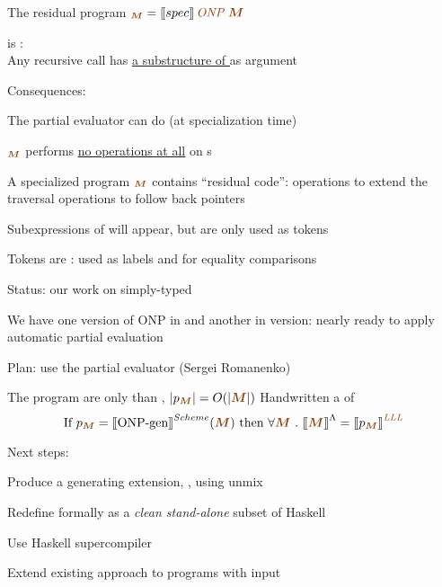 \documentclass[12pt,fleqn,landscape]{article}
\begin{document}
\begin{slide}{The residual program $_{\lam{$M$}} = 
  \lsem \lowercase{spec}\rsem \, \lam{ONP}\ \lam{$M$}$}

 is :\\

\hfill{Any recursive  call has \underline{\underline{a substructure 
  of }} as argument}
\vair\vair

Consequences:
\bi
\vair

\ii The partial evaluator can do (at specialization time)

  \hfill {}
\ii {}$_{\lam{$M$}}$ performs \underline{no operations at all} on 
  {\lexp}s
\vair

\ii A specialized program $_{\lam{$M$}}$ contains ``residual code'':
  \bi
  \ii operations to extend the traversal
  \ii operations to follow back pointers
  \ei
\vair

\ii Subexpressions of  will appear, but are only used as tokens
  \vair

  Tokens are : used as labels and for equality comparisons
\ei

\end{slide}


\begin{slide}{Status: our work on simply-typed \lc }

\be
\ii We have one version of ONP in   and another in 
 version: nearly ready to apply automatic partial evaluation

  Plan: use the  partial evaluator (Sergei Romanenko)

\ii The  program are only  than , 
  $|p_{\lam{$M$}}| = O(|\lam{$M$}|)$
\ii Handwritten a  of 
  $$
  \mbox{If\ }p_{\lam{$M$}} = \lsem \mbox{ONP-gen} \rsem^{\sc Scheme} 
  (\lam{$M$}) \mbox{\ then\ } \forall \lam{$M$} \ .\ \lsem \lam{$M$}
  \rsem^\Lambda =  \lsem p_{\lam{$M$}} \rsem^{\lam{LLL}} 
  $$

\ii Next steps:
\vair

  \bi
  \ii Produce a generating extension, , using {\sc unmix}
\vair

  \ii Redefine  formally as a \textit{clean stand-alone} subset of
    {\sc Haskell}
\vair

  \ii Use {\sc Haskell} supercompiler
\vair

  \ii Extend existing approach to programs with  input
  \ei
\ee
\end{slide}
\end{document}
